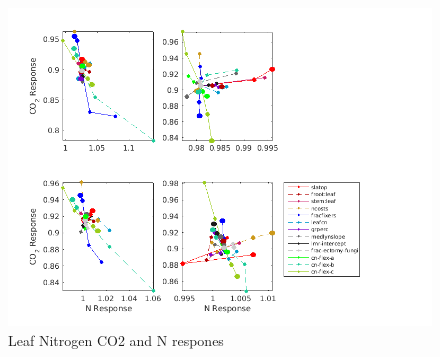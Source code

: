 \documentclass[draft,linenumbers]{agujournal}
\begin{document}
\begin{figure}[h]
     \centering
     \includegraphics[width=1.55\textwidth, left]{matlab/figures/OCT_CNdep_LEAFN1_CLM50defpft_ndep_1x1pt_US-Me2_ens_MIC_p2006.png}
     \caption{Leaf Nitrogen  CO2 and N respones}
     \label{Leaf Nitrogen CO2 and N respones}
  \end{figure}
  
  
\end{document}
